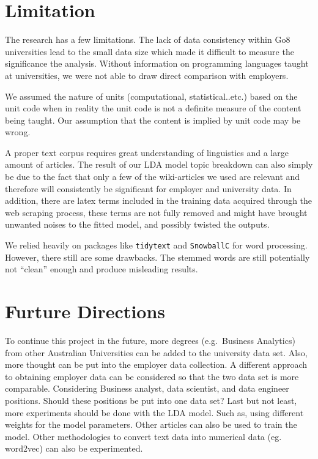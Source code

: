 \documentclass[
  letterpaper,
]{report}
\begin{document}
\hypertarget{limitation}{%
\section{Limitation}\label{limitation}}

The research has a few limitations. The lack of data consistency within
Go8 universities lead to the small data size which made it difficult to
measure the significance the analysis. Without information on
programming languages taught at universities, we were not able to draw
direct comparison with employers.

We assumed the nature of units (computational, statistical..etc.) based
on the unit code when in reality the unit code is not a definite measure
of the content being taught. Our assumption that the content is implied
by unit code may be wrong.

A proper text corpus requires great understanding of linguistics and a
large amount of articles. The result of our LDA model topic breakdown
can also simply be due to the fact that only a few of the wiki-articles
we used are relevant and therefore will consistently be significant for
employer and university data. In addition, there are latex terms
included in the training data acquired through the web scraping process,
these terms are not fully removed and might have brought unwanted noises
to the fitted model, and possibly twisted the outputs.

We relied heavily on packages like \texttt{tidytext} and
\texttt{SnowballC} for word processing. However, there still are some
drawbacks. The stemmed words are still potentially not ``clean'' enough
and produce misleading results.

\hypertarget{furture-directions}{%
\section{Furture Directions}\label{furture-directions}}

To continue this project in the future, more degrees (e.g.~Business
Analytics) from other Australian Universities can be added to the
university data set. Also, more thought can be put into the employer
data collection. A different approach to obtaining employer data can be
considered so that the two data set is more comparable. Considering
Business analyst, data scientist, and data engineer positions. Should
these positions be put into one data set? Last but not least, more
experiments should be done with the LDA model. Such as, using different
weights for the model parameters. Other articles can also be used to
train the model. Other methodologies to convert text data into numerical
data (eg. word2vec) can also be experimented.
\end{document}
